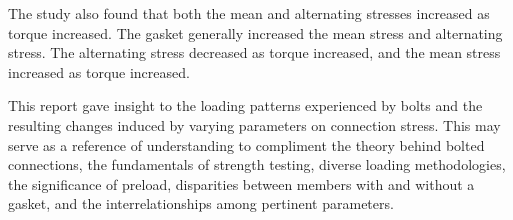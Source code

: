     The study also found that both the mean and alternating stresses increased as torque increased. The gasket generally increased the mean stress and alternating stress. The alternating stress decreased as torque increased, and the mean stress increased as torque increased.

    This report gave insight to the loading patterns experienced by bolts and the resulting changes induced by varying parameters on connection stress. This may serve as a reference of understanding to compliment the theory behind bolted connections, the fundamentals of strength testing, diverse loading methodologies, the significance of preload, disparities between members with and without a gasket, and the interrelationships among pertinent parameters.
